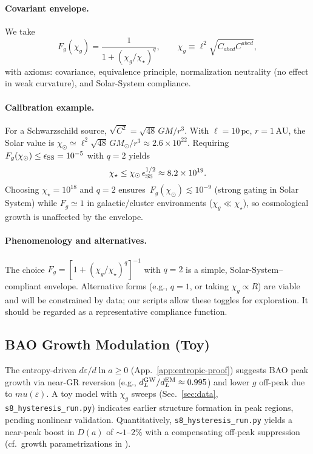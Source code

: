 \documentclass[aps,prd,onecolumn,superscriptaddress,nofootinbib]{revtex4-2}
\def\mu{mu}%
\providecommand{\be}{\begin{equation}}
\providecommand{\ee}{\end{equation}}
\begin{document}
\paragraph{Covariant envelope.}
We take
\be
F_g(\chi_g)=\frac{1}{1+(\chi_g/\chi_\star)^q},\qquad \chi_g\equiv \ell^2\sqrt{C_{abcd}C^{abcd}},
\ee
with axioms: covariance, equivalence principle, normalization neutrality (no effect in weak curvature), and Solar-System compliance.

\paragraph{Calibration example.}
For a Schwarzschild source, \(\sqrt{C^2}=\sqrt{48}\,GM/r^3\). With \(\ell=10\,\mathrm{pc}\), \(r=1\,\mathrm{AU}\), the Solar value is \(\chi_\odot\simeq \ell^2 \sqrt{48}\,GM_\odot/r^3\approx 2.6\times 10^{22}\). Requiring \(F_g(\chi_\odot)\le \epsilon_{\rm SS}=10^{-5}\) with \(q=2\) yields
\be
\chi_\star \le \chi_\odot\,\epsilon_{\rm SS}^{1/2}\approx 8.2\times 10^{19}.
\ee
Choosing \(\chi_\star=10^{18}\) and \(q=2\) ensures \(\,F_g(\chi_\odot)\lesssim 10^{-9}\) (strong gating in Solar System) while \(F_g\simeq 1\) in galactic/cluster environments (\(\chi_g\ll \chi_\star\)), so cosmological growth is unaffected by the envelope.

\paragraph{Phenomenology and alternatives.}
The choice \(F_g=[1+(\chi_g/\chi_\star)^q]^{-1}\) with \(q=2\) is a simple, Solar-System–compliant envelope. Alternative forms (e.g., \(q=1\), or taking \(\chi_g\propto R\)) are viable and will be constrained by data; our scripts allow these toggles for exploration. It should be regarded as a representative compliance function.

\subsection{BAO Growth Modulation (Toy)}
The entropy-driven \(d\varepsilon/d\ln a \geq 0\) (App.~\ref{app:entropic-proof}) suggests BAO peak growth via near-GR reversion (e.g., \(d_L^{\rm GW}/d_L^{\rm EM}\approx 0.995\)) and lower \(g\) off-peak due to \(\mu(\varepsilon)\). A toy model with \(\chi_g\) sweeps (Sec.~\ref{sec:data}, \texttt{s8\_hysteresis\_run.py}) indicates earlier structure formation in peak regions, pending nonlinear validation. Quantitatively, \texttt{s8\_hysteresis\_run.py} yields a near-peak boost in \(D(a)\) of \(\sim 1\text{--}2\%\) with a compensating off-peak suppression (cf.\ growth parametrizations in \cite{BelliniSawicki2014}).
\end{document}
